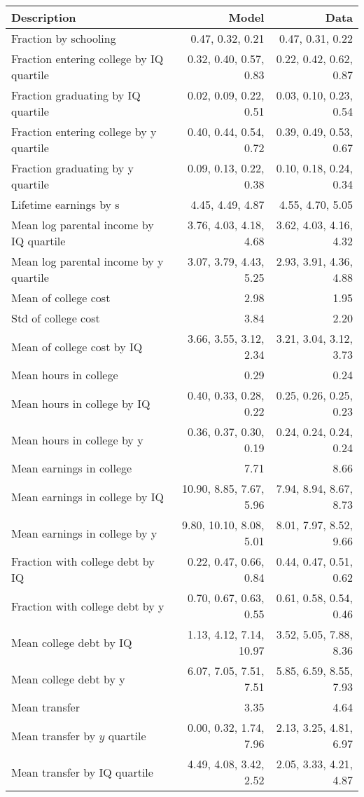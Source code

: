 \begin{tabular}{lrr}
\hline
Description & Model  & Data  \\
\hline
Fraction by schooling & 0.47, 0.32, 0.21  & 0.47, 0.31, 0.22  \\
Fraction entering college by IQ quartile & 0.32, 0.40, 0.57, 0.83  & 0.22, 0.42, 0.62, 0.87  \\
Fraction graduating by IQ quartile & 0.02, 0.09, 0.22, 0.51  & 0.03, 0.10, 0.23, 0.54  \\
Fraction entering college by y quartile & 0.40, 0.44, 0.54, 0.72  & 0.39, 0.49, 0.53, 0.67  \\
Fraction graduating by y quartile & 0.09, 0.13, 0.22, 0.38  & 0.10, 0.18, 0.24, 0.34  \\
Lifetime earnings by s & 4.45, 4.49, 4.87  & 4.55, 4.70, 5.05  \\
Mean log parental income by IQ quartile & 3.76, 4.03, 4.18, 4.68  & 3.62, 4.03, 4.16, 4.32  \\
Mean log parental income by y quartile & 3.07, 3.79, 4.43, 5.25  & 2.93, 3.91, 4.36, 4.88  \\
Mean of college cost & 2.98  & 1.95  \\
Std of college cost & 3.84  & 2.20  \\
Mean of college cost by IQ & 3.66, 3.55, 3.12, 2.34  & 3.21, 3.04, 3.12, 3.73  \\
Mean hours in college & 0.29  & 0.24  \\
Mean hours in college by IQ & 0.40, 0.33, 0.28, 0.22  & 0.25, 0.26, 0.25, 0.23  \\
Mean hours in college by y & 0.36, 0.37, 0.30, 0.19  & 0.24, 0.24, 0.24, 0.24  \\
Mean earnings in college & 7.71  & 8.66  \\
Mean earnings in college by IQ & 10.90, 8.85, 7.67, 5.96  & 7.94, 8.94, 8.67, 8.73  \\
Mean earnings in college by y & 9.80, 10.10, 8.08, 5.01  & 8.01, 7.97, 8.52, 9.66  \\
Fraction with college debt by IQ & 0.22, 0.47, 0.66, 0.84  & 0.44, 0.47, 0.51, 0.62  \\
Fraction with college debt by y & 0.70, 0.67, 0.63, 0.55  & 0.61, 0.58, 0.54, 0.46  \\
Mean college debt by IQ & 1.13, 4.12, 7.14, 10.97  & 3.52, 5.05, 7.88, 8.36  \\
Mean college debt by y & 6.07, 7.05, 7.51, 7.51  & 5.85, 6.59, 8.55, 7.93  \\
Mean transfer & 3.35  & 4.64  \\
Mean transfer by $y$ quartile & 0.00, 0.32, 1.74, 7.96  & 2.13, 3.25, 4.81, 6.97  \\
Mean transfer by IQ quartile & 4.49, 4.08, 3.42, 2.52  & 2.05, 3.33, 4.21, 4.87  \\
\hline
\end{tabular}%
